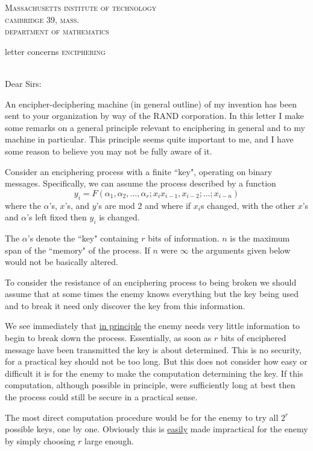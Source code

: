 \documentclass[11pt]{article}
\begin{document}
\noindent\textsc{Massachusetts institute of technology
\\
cambridge 39, mass.
\\
department of mathematics}
\begin{flushright}
letter concerns \textsc{enciphering}
\end{flushright}
\\
\noindent Dear Sirs:
\\
\par
An  encipher-deciphering  machine  (in  general  outline)  of  my  invention has been sent to your organization by way of the RAND corporation.  In this letter I make some remarks on a general principle relevant to enciphering in general and to my machine in particular.  This principle seems quite important to me, and I have some reason to believe you may not be fully aware of it.

Consider  an  enciphering  process  with  a finite  ``key",  operating  on  binary messages.  Specifically, we can assume the process described by a function
\[
y_i=F(\alpha_1, \alpha_2,\ldots, \alpha_r; x_i x_{i-1},x_{i-2};\ldots;x_{i-n})
\]
where the $\alpha$'s, $x$'s, and $y$'s are mod 2 and where if $x_i$s changed, with the other $x$'s and $\alpha$'s left  fixed then $y_i$ is changed.

The $\alpha$'s denote the ``key" containing $r$ bits of information. $n$ is the maximum span of the ``memory" of the process.  If $n$ were $\infty$ the arguments given below would not be basically altered.

To  consider  the  resistance  of  an  enciphering  process  to  being  broken  we should  assume  that  at  some  times  the  enemy  knows  everything  but  the  key being used and to break it need only discover the key from this information. 

We see immediately that \underline{in principle} the enemy needs very little information to begin to break down the process.  Essentially, as soon as $r$ bits of enciphered message have been transmitted the key is about determined.  This is no security, for a practical key should not be too long.  But this does not consider how easy or difficult it is for the enemy to make the computation determining the key.  If this computation, although possible in principle, were sufficiently long at best then the process could still be secure in a practical sense.

The most direct computation procedure would be for the enemy to try all $2^r$ possible keys, one by one.  Obviously this is \underline{easily} made impractical for the enemy by simply choosing $r$ large enough.
\end{document}
